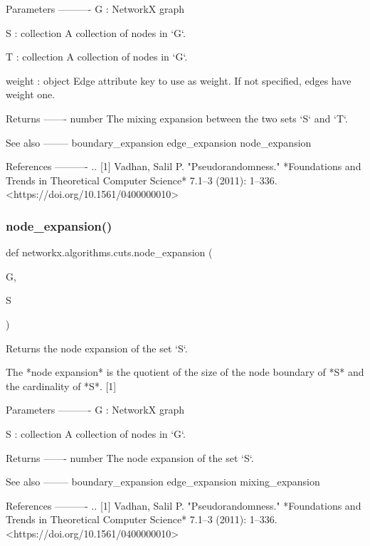 \begin{DoxyVerb}
\begin{DoxyVerb}
Parameters
----------
G : NetworkX graph

S : collection
    A collection of nodes in `G`.

T : collection
    A collection of nodes in `G`.

weight : object
    Edge attribute key to use as weight. If not specified, edges
    have weight one.

Returns
-------
number
    The mixing expansion between the two sets `S` and `T`.

See also
--------
boundary_expansion
edge_expansion
node_expansion

References
----------
.. [1] Vadhan, Salil P.
       "Pseudorandomness."
       *Foundations and Trends
       in Theoretical Computer Science* 7.1–3 (2011): 1–336.
       <https://doi.org/10.1561/0400000010>\end{DoxyVerb}
 \mbox{\label{namespacenetworkx_1_1algorithms_1_1cuts_a0baf73cd3e4ac469e4e401b321c33dcc}} 
\subsubsection{\texorpdfstring{node\+\_\+expansion()}{node\_expansion()}}
{\footnotesize\ttfamily def networkx.\+algorithms.\+cuts.\+node\+\_\+expansion (\begin{DoxyParamCaption}\item[{}]{G,  }\item[{}]{S }\end{DoxyParamCaption})}

\begin{DoxyVerb}Returns the node expansion of the set `S`.

The *node expansion* is the quotient of the size of the node
boundary of *S* and the cardinality of *S*. [1]

Parameters
----------
G : NetworkX graph

S : collection
    A collection of nodes in `G`.

Returns
-------
number
    The node expansion of the set `S`.

See also
--------
boundary_expansion
edge_expansion
mixing_expansion

References
----------
.. [1] Vadhan, Salil P.
       "Pseudorandomness."
       *Foundations and Trends
       in Theoretical Computer Science* 7.1–3 (2011): 1–336.
       <https://doi.org/10.1561/0400000010>\end{DoxyVerb}
 \mbox{\label{namespacenetworkx_1_1algorithms_1_1cuts_a7092b90008f99838b113597d801b9e9a}} 

\end{DoxyVerb}
